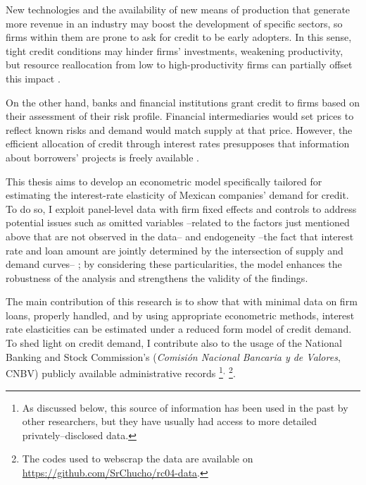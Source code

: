 \documentclass[11pt, oneside]{book}
\let\oldfootnote\footnote %
\renewcommand\footnote[1]{%
\oldfootnote{\hspace{0.05mm}#1}}
\begin{document}
New technologies and the availability of new means of production that generate more revenue in an industry may boost the development of specific sectors, so firms within them are prone to ask for credit to be early adopters. In this sense, tight credit conditions may hinder firms' investments, weakening productivity, but resource reallocation from low to high-productivity firms can partially offset this impact \citep{azevedo_bank_2021}.

On the other hand, banks and financial institutions grant credit to firms based on their assessment of their risk profile. Financial intermediaries would set prices to reflect known risks and demand would match supply at that price. However, the efficient allocation of credit through interest rates presupposes that information about borrowers' projects is freely available \citep{blundell1992credit}.

This thesis aims to develop an econometric model specifically tailored for estimating the interest-rate elasticity of Mexican companies’ demand for credit. To do so, I exploit panel-level data with firm fixed effects and controls to address potential issues such as omitted variables --related to the factors just mentioned above that are not observed in the data-- and endogeneity --the fact that interest rate and loan amount are jointly determined by the intersection of supply and demand curves-- ; by considering these particularities, the model enhances the robustness of the analysis and strengthens the validity of the findings. 

The main contribution of this research is to show that with minimal data on firm loans, properly handled, and by using appropriate econometric methods, interest rate elasticities can be estimated under a reduced form model of credit demand. To shed light on credit demand, I contribute also to the usage of the National Banking and Stock Commission's (\textit{Comisión Nacional Bancaria y de Valores}, CNBV) publicly available administrative records\footnote{As discussed below, this source of information has been used in the past by other researchers, but they have usually had access to more detailed privately--disclosed data.}$^,$\footnote{The codes used to webscrap the data are available on \url{https://github.com/SrChucho/rc04-data}.}.
\end{document}
